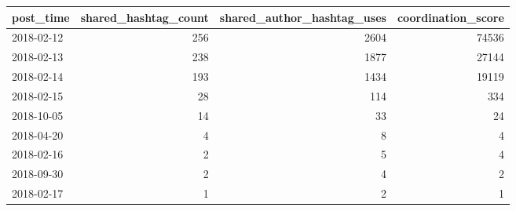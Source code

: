 \begin{tabular}{lrrr}
\toprule
post\_time & shared\_hashtag\_count & shared\_author\_hashtag\_uses & coordination\_score \\
\midrule
2018-02-12 & 256 & 2604 & 74536 \\
2018-02-13 & 238 & 1877 & 27144 \\
2018-02-14 & 193 & 1434 & 19119 \\
2018-02-15 & 28 & 114 & 334 \\
2018-10-05 & 14 & 33 & 24 \\
2018-04-20 & 4 & 8 & 4 \\
2018-02-16 & 2 & 5 & 4 \\
2018-09-30 & 2 & 4 & 2 \\
2018-02-17 & 1 & 2 & 1 \\
\bottomrule
\end{tabular}
